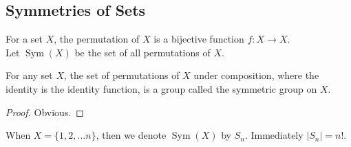 \subsection{Symmetries of Sets}
For a set $X$, the permutation of $X$ is a bijective function $f:X\to X$.\\
Let $\operatorname{Sym}(X)$ be the set of all permutations of $X$.
\begin{theorem}
    For any set $X$, the set of permutations of $X$ under composition, where the identity is the identity function, is a group called the symmetric group on $X$.
\end{theorem}
\begin{proof}
    Obvious.
\end{proof}
When $X=\{1,2,\ldots n\}$, then we denote $\operatorname{Sym}(X)$ by $S_n$.
Immediately $|S_n|=n!$.

